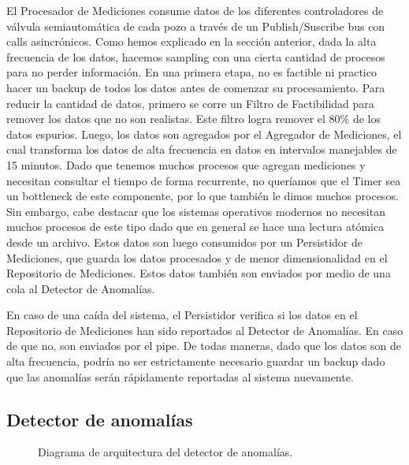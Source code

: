 \documentclass{article}
\theoremstyle{definition}
\theoremstyle{remark}
\begin{document}
El Procesador de Mediciones consume datos de los diferentes controladores de válvula semiautomática de cada pozo a través de un Publish/Suscribe bus con calls asincrónicos. Como hemos explicado en la sección anterior, dada la alta frecuencia de los datos, hacemos sampling con una cierta cantidad de procesos para no perder información. En una primera etapa, no es factible ni practico hacer un backup de todos los datos antes de comenzar su procesamiento. Para reducir la cantidad de datos, primero se corre un Filtro de Factibilidad para remover los datos que no son realistas. Este filtro logra remover el 80\% de los datos espurios. Luego, los datos son agregados por el Agregador de Mediciones, el cual transforma los datos de alta frecuencia en datos en intervalos manejables de 15 minutos. Dado que tenemos muchos procesos que agregan mediciones y necesitan consultar el tiempo de forma recurrente, no queríamos que el Timer sea un bottleneck de este componente, por lo que también le dimos muchos procesos. Sin embargo, cabe destacar que los sistemas operativos modernos no necesitan muchos procesos de este tipo dado que en general se hace una lectura atómica desde un archivo. Estos datos son luego consumidos por un Persistidor de Mediciones, que guarda los datos procesados y de menor dimensionalidad en el Repositorio de Mediciones. Estos datos también son enviados por medio de una cola al Detector de Anomalías.

En caso de una caída del sistema, el Persistidor verifica si los datos en el Repositorio de Mediciones han sido reportados al Detector de Anomalías. En caso de que no, son enviados por el pipe. De todas maneras, dado que los datos son de alta frecuencia, podría no ser estrictamente necesario guardar un backup dado que las anomalías serán rápidamente reportadas al sistema nuevamente.

\subsection{Detector de anomalías} \label{detector_anomalias}

\begin{figure}[H]
  \caption{Diagrama de arquitectura del detector de anomalías.}
\end{figure}
\end{document}
